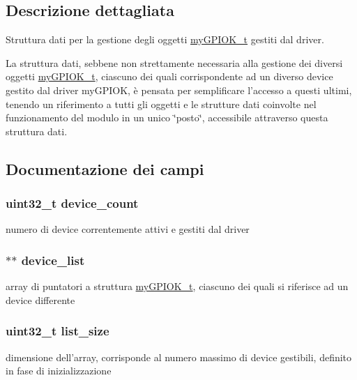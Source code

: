 \subsection{Descrizione dettagliata}
Struttura dati per la gestione degli oggetti \hyperlink{structmy_g_p_i_o_k__t}{my\+G\+P\+I\+O\+K\+\_\+t} gestiti dal driver. 

La struttura dati, sebbene non strettamente necessaria alla gestione dei diversi oggetti \hyperlink{structmy_g_p_i_o_k__t}{my\+G\+P\+I\+O\+K\+\_\+t}, ciascuno dei quali corrispondente ad un diverso device gestito dal driver my\+G\+P\+I\+O\+K, è pensata per semplificare l'accesso a questi ultimi, tenendo un riferimento a tutti gli oggetti e le strutture dati coinvolte nel funzionamento del modulo in un unico \char`\"{}posto\char`\"{}, accessibile attraverso questa struttura dati. 

\subsection{Documentazione dei campi}
\hypertarget{structmy_g_p_i_o_k__list__t_a170d1d78f27f6ab4c8badaaa4b3f2305}{
\subsubsection[{device\+\_\+count}]{\setlength{\rightskip}{0pt plus 5cm}uint32\+\_\+t device\+\_\+count}}\label{structmy_g_p_i_o_k__list__t_a170d1d78f27f6ab4c8badaaa4b3f2305}
numero di device correntemente attivi e gestiti dal driver \hypertarget{structmy_g_p_i_o_k__list__t_a99b54fb4cab6e0b7ea3bd94415bbcca0}{
\subsubsection[{device\+\_\+list}]{$\ast$$\ast$ device\+\_\+list}}\label{structmy_g_p_i_o_k__list__t_a99b54fb4cab6e0b7ea3bd94415bbcca0}
array di puntatori a struttura \hyperlink{structmy_g_p_i_o_k__t}{my\+G\+P\+I\+O\+K\+\_\+t}, ciascuno dei quali si riferisce ad un device differente \hypertarget{structmy_g_p_i_o_k__list__t_aeff61809685e5df1b38aec1d871a49bb}{
\subsubsection[{list\+\_\+size}]{\setlength{\rightskip}{0pt plus 5cm}uint32\+\_\+t list\+\_\+size}}\label{structmy_g_p_i_o_k__list__t_aeff61809685e5df1b38aec1d871a49bb}
dimensione dell'array, corrisponde al numero massimo di device gestibili, definito in fase di inizializzazione 

